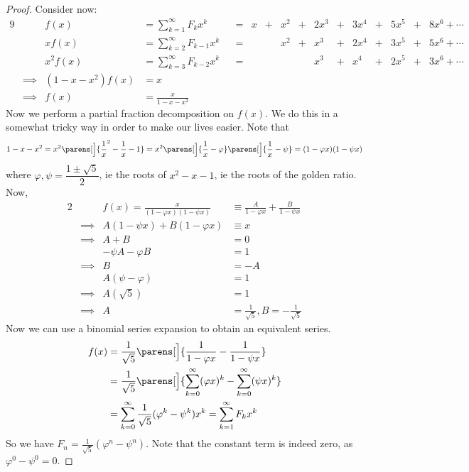 \begin{proof}
Consider now:
\begin{alignat*}9
&& f(x) &= \sum_{k = 1}^\infty F_k x^k
    &&={}& x &+{}& x^2 &+{}& 2x^3 &+{}&
        3x^4 &+{}& 5x^5 &+{}& 8x^6 + \dotsb \\
&& x f(x) &= \sum_{k = 2}^\infty F_{k - 1} x^k
    &&={}& &&x^2 &+{}& x^3 &+{}& 2x^4 &+{}&
        3x^5 &+{}& 5x^6 + \dotsb \\
&& x^2 f(x) &= \sum_{k = 3}^\infty F_{k - 2}x^k
    &&={}& &&&& x^3 &+{}& x^4 &+{}& 2x^5 &+{}& 3x^6 + \dotsb \\
&\implies& (1 - x - x^2) f(x) &= x \\
&\implies& f(x) &= \frac x{1 - x - x^2}
\end{alignat*}
Now we perform a partial fraction decomposition on \(f(x)\). We do this in a
somewhat tricky way in order to make our lives easier. Note that
\begin{equation*}
1 - x - x^2 = x^2 \parens[\Big]{\frac 1x^2 - \frac 1x - 1}
    = x^2\parens[\Big]{\frac 1x - \varphi}\parens[\Big]{\frac 1x - \psi}
    = (1 - \varphi x)(1 - \psi x)
\end{equation*}
where \(\varphi, \psi = \dfrac{1 \pm \sqrt 5}2\), ie the roots of
\(x^2 - x - 1\), ie the roots of the golden ratio. Now,
\begin{alignat*}2
&& f(x) = \frac x{(1 - \varphi x)(1 - \psi x)}
    &\equiv \frac A{1 - \varphi x} + \frac B{1 - \psi x} \\
&\implies& A(1 - \psi x) + B(1 - \varphi x) &\equiv x \\
&\implies& A + B &= 0 \\
&& -\psi A - \varphi B &= 1 \\
&\implies& B &= -A  \\
&& A(\psi - \varphi) &= 1 \\
&\implies& A(\sqrt 5) &= 1 \\
&\implies& A &= \frac 1{\sqrt 5}, B = -\frac 1{\sqrt 5}
\end{alignat*}
Now we can use a binomial series expansion to obtain an equivalent series.
\begin{align*}
f(x) &= \frac 1{\sqrt 5}\parens[\Big]{\frac 1{1 - \varphi x}
                            - \frac 1{1 - \psi x}} \\
&= \frac 1{\sqrt 5}\parens[\Big]{\sum_{k = 0}^\infty (\varphi x)^k
                       - \sum_{k = 0}^\infty (\psi x)^k} \\
&= \sum_{k = 0}^\infty \frac 1{\sqrt 5}(\varphi^k - \psi^k)x^k
= \sum_{k = 1}^\infty F_k x^k
\end{align*}
So we have \(F_n = \frac 1{\sqrt 5}(\varphi^n - \psi^n)\). Note that the
constant term is indeed zero, as \(\varphi^0 - \psi^0 = 0\).
\end{proof}
